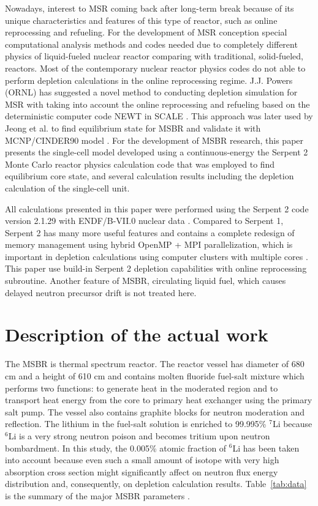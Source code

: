 \documentclass{anstrans}
\begin{document}
Nowadays, interest to \gls{MSR} coming back after long-term break because of 
its unique characteristics and features of this type of reactor, such as online 
reprocessing and refueling. For the development of \gls{MSR} conception special 
computational analysis methods and codes needed due to completely different 
physics of liquid-fueled nuclear reactor comparing with traditional, 
solid-fueled, reactors. Most of the contemporary nuclear reactor physics codes 
do not able to perform depletion calculations in the online reprocessing 
regime. J.J. Powers (\gls{ORNL}) has suggested a novel method to conducting 
depletion simulation for \gls{MSR} with taking into account the online 
reprocessing and refueling based on the deterministic computer code NEWT in 
SCALE \cite{powers_new_2013}. This approach was later used by Jeong et al. to 
find equilibrium state for \gls{MSBR} and validate it with \gls{MCNP}/CINDER90 
model \cite{jeong_equilibrium_2016}. For the development of \gls{MSBR} 
research, this paper presents the single-cell model developed using a 
continuous-energy the Serpent 2 Monte Carlo reactor physics calculation code 
that was employed to find equilibrium core state, and several calculation 
results including the depletion calculation of the single-cell unit.

All calculations presented in this paper were performed using the Serpent 2 
code version 2.1.29 with ENDF/B-VII.0
nuclear data \cite{leppanen_serpent_2012,chadwick_endf/b-vii.0:_2006}. Compared 
to Serpent 1, Serpent 2 has many more useful features and contains a complete 
redesign of memory management using hybrid OpenMP + MPI parallelization, which 
is important in depletion calculations using computer clusters with multiple 
cores \cite{leppanen_serpent_2015}. This paper use build-in Serpent 2 depletion 
capabilities with online reprocessing subroutine. Another feature of 
\gls{MSBR}, circulating
liquid fuel, which causes delayed neutron precursor drift is not treated here.

\section{Description of the actual work}
The \gls{MSBR} is thermal spectrum reactor. The reactor vessel has diameter of 
680 cm and a height of 610 cm and contains molten fluoride fuel-salt mixture 
which performs two functions: to generate heat in the moderated region and to 
transport heat energy from the core to primary heat exchanger using the primary 
salt pump. The vessel also contains graphite blocks for neutron moderation and 
reflection. The lithium in the fuel-salt solution is enriched to 99.995\% 
$^7$Li because $^6$Li is a very strong neutron poison and becomes tritium upon 
neutron bombardment. In this study, the 0.005\% atomic fraction of $^6$Li has 
been taken into account because even such a small amount of isotope with very 
high absorption cross section might significantly affect on neutron flux energy 
distribution and, consequently, on depletion calculation results. 
Table~\ref{tab:data} is the summary of the major \gls{MSBR} parameters 
\cite{robertson_conceptual_1971}. 
\end{document}
